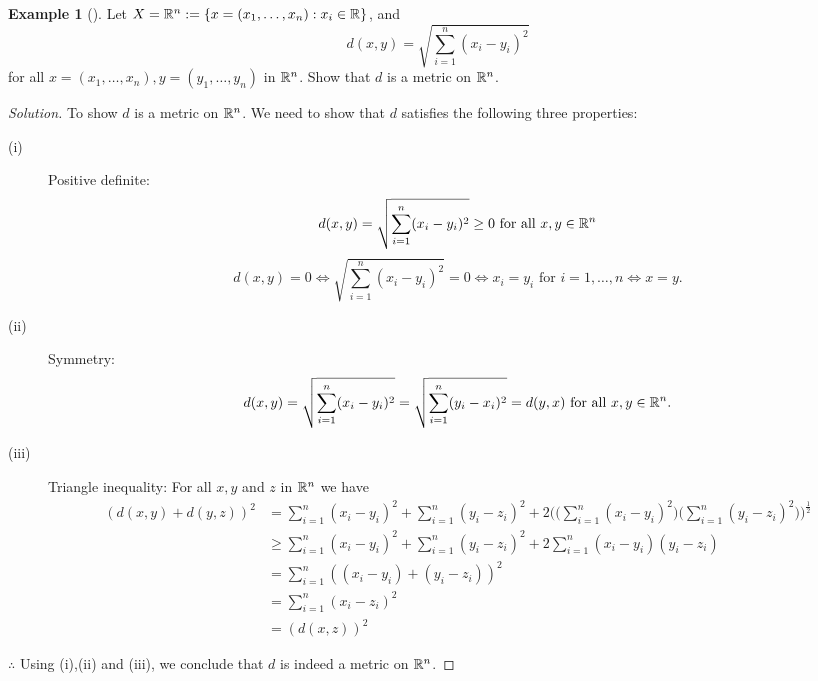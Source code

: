 \documentclass[	DIV=calc,paper=a4,fontsize=11pt]{scrartcl}	 	%
\theoremstyle{definition}
\newtheorem{exmp}[thm]{Example}
\theoremstyle{plain}
\theoremstyle{remark}
\begin{document}
\begin{exmp}[]
Let $X=\Bbb R^n:=\{x=(x_1,\ldots,x_n):x_i\in \Bbb R\}$, and
\[d(x,y)=\sqrt{\sum_{i=1}^{n} (x_i-y_i)^2}\]
for all $x=(x_1,\ldots,x_n),y=(y_1,\ldots,y_n)$ in $\Bbb R^n$. Show that $d$ is a metric on $\Bbb R^n$.
\end{exmp}
\begin{proof}[Solution]
To show $d$ is a metric on $\Bbb R^n$. We need to show that $d$ satisfies the following three properties:
\begin{description}
  \item[(i)] Positive definite:
\[d(x,y) =\sqrt{\sum_{i=1}^{n}(x_i-y_i)^2}\ge 0 \text{ for all } x, y\in \Bbb R^n\]
\[d(x,y) = 0 \Leftrightarrow \sqrt{\sum_{i=1}^{n}(x_i-y_i)^2} = 0 \Leftrightarrow x_i = y_i \text{ for }i = 1,\ldots,n \Leftrightarrow x=y.\]
  \item[(ii)] Symmetry:
\[d(x,y) = \sqrt{\sum_{i=1}^{n}(x_i-y_i)^2} =\sqrt{\sum_{i=1}^{n}(y_i-x_i)^2}= d(y ,x) \text{ for all }x, y \in \Bbb R^n.\]
  \item[(iii)] Triangle inequality: For all $x,y$ and $z$ in $\Bbb R^n$ we have
\begin{align*}
(d(x,y) + d(y,z))^2 &= \sum_{i=1}^{n}(x_i-y_i)^2+ \sum_{i=1}^{n}(y_i-z_i)^2+2\biggl(\biggl(\sum_{i=1}^{n}(x_i-y_i)^2\biggl)\biggl(\sum_{i=1}^{n}(y_i-z_i)^2\biggl)\biggl)^{\frac{1}{2}}\\
                    &\ge \sum_{i=1}^{n}(x_i-y_i)^2+\sum_{i=1}^{n}(y_i-z_i)^2+2\sum_{i=1}^{n}(x_i-y_i)(y_i-z_i)
                    \tag{using Cauchy 's inequality $(\sum a_i^2)(\sum b_i^2)\ge (\sum a_ib_i)^2$}\\
                    &=\sum_{i=1}^{n}((x_i-y_i)+(y_i-z_i))^2\\
                    &=\sum_{i=1}^{n}(x_i-z_i)^2\\
                    &=(d(x,z))^2
\end{align*}
\end{description}
$\therefore$ Using (i),(ii) and (iii), we conclude that $d$ is indeed a metric on $\Bbb R^n$.
\end{proof}
\end{document}
